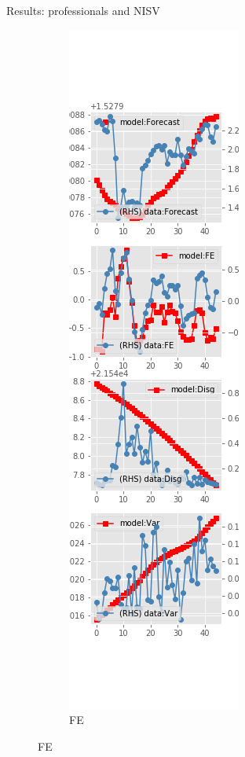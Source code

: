 \documentclass{beamer}
\begin{document}
\begin{frame}{Results: professionals and NISV}
\begin{figure}[ht]
\begin{subfigure}[b]{0.19\textwidth}
		\end{subfigure}
		\hfill
		\begin{subfigure}[b]{0.19\textwidth}
			\caption{FE}
			\includegraphics[width=\textwidth, height = 0.8\textheight]{figuresDraft/spf_ni_est_sv_diag1.png}

\end{subfigure}
\end{figure}
\end{frame}
\end{document}
